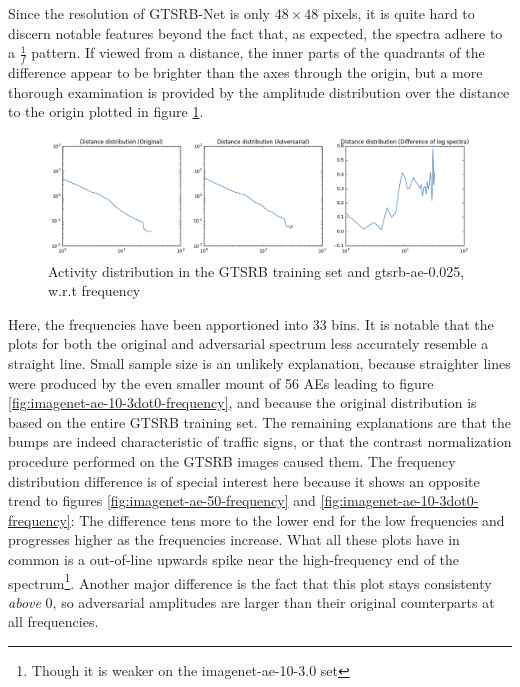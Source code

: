 \documentclass[11pt, a4paper]{article}
\begin{document}
Since the resolution of GTSRB-Net is only $48 \times 48$ pixels, it is quite hard to discern notable features beyond the fact that, as expected, the spectra adhere to a $\frac{1}{f}$ pattern. If viewed from a distance, the inner parts of the quadrants of the difference appear to be brighter than the axes through the origin, but a more thorough examination is provided by the amplitude distribution over the distance to the origin plotted in figure \ref{fig:gtsrb-ae-0dot025-frequency}.

\begin{figure}[h!tb]
	\centering
	\includegraphics[width=\textwidth]{images/spectra/gtsrb-ae-0dot025-minconfidence-0dot5-maxorig-0-distance-33-bins.png}
	\caption{Activity distribution in the GTSRB training set and gtsrb-ae-0.025, w.r.t frequency}
	\label{fig:gtsrb-ae-0dot025-frequency}
\end{figure}

Here, the frequencies have been apportioned into 33 bins. It is notable that the plots for both the original and adversarial spectrum less accurately resemble a straight line. Small sample size is an unlikely explanation, because straighter lines were produced by the even smaller mount of 56 AEs leading to figure \ref{fig:imagenet-ae-10-3dot0-frequency}, and because the original distribution is based on the entire GTSRB training set. The remaining explanations are that the bumps are indeed characteristic of traffic signs, or that the contrast normalization procedure performed on the GTSRB images caused them. The frequency distribution difference is of special interest here because it shows an opposite trend to figures \ref{fig:imagenet-ae-50-frequency} and \ref{fig:imagenet-ae-10-3dot0-frequency}: The difference tens more to the lower end for the low frequencies and progresses higher as the frequencies increase. What all these plots have in common is a out-of-line upwards spike near the high-frequency end of the spectrum\footnote{Though it is weaker on the imagenet-ae-10-3.0 set}. Another major difference is the fact that this plot stays consistenty \emph{above} 0, so adversarial amplitudes are larger than their original counterparts at all frequencies.
\end{document}
